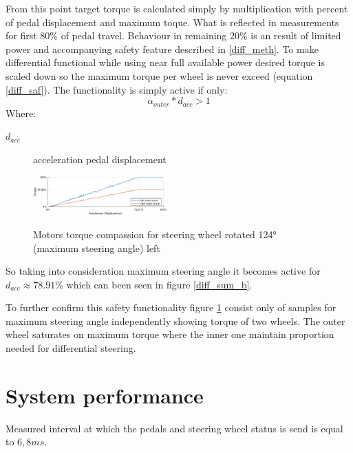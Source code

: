 From this point target torque is calculated simply by multiplication with percent of pedal displacement and maximum toque. What is reflected in measurements for first $80\%$ of pedal travel. 
Behaviour in remaining $20\%$ is an result of limited power and accompanying safety feature described in \ref{diff_meth}. To make differential functional while using near full available power desired torque is scaled down so the maximum torque per wheel is never exceed (equation \ref{diff_saf}).
The functionality is simply active if only: \begin{equation*}
    \alpha_{outer} * d_{acc}>1
\end{equation*} 
Where:
\begin{description}
    \item[$d_{acc}$] acceleration pedal displacement
\end{description}

\begin{figure}
    \vspace{-20pt}
    \begin{center}
        \includegraphics[width=0.46\textwidth]{figures/diff_123}
        \label{diff_123}
        \caption{Motors torque compassion for steering wheel rotated 124° (maximum steering angle) left}
    \end{center}
    \vspace{-20pt}
\end{figure}
So taking into consideration maximum steering angle it becomes active for $d_{acc} \approx 78.91\%$ which can been seen in figure \ref{diff_sum_b}.

To further confirm this safety functionality figure \ref{diff_123} consist only of samples for maximum steering angle independently showing torque of two wheels. The outer wheel saturates on maximum torque where the inner one maintain proportion needed for differential steering.







\section{System performance}
\todo{!}
Measured interval at which the pedals and steering wheel status is send is equal to $6,8ms$.